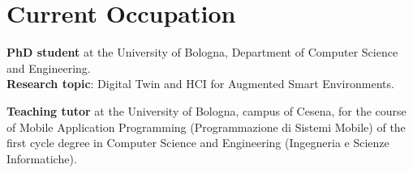 \section{Current Occupation}

\textbf{PhD student} at the University of Bologna, Department of Computer Science and Engineering.\\
\textbf{Research topic}: Digital Twin and HCI for Augmented Smart Environments.

\textbf{Teaching tutor} at the University of Bologna, campus of Cesena, for the course of Mobile Application Programming (Programmazione di Sistemi Mobile) of the first cycle degree in Computer Science and Engineering (Ingegneria e Scienze Informatiche).

\vspace{20pt}
